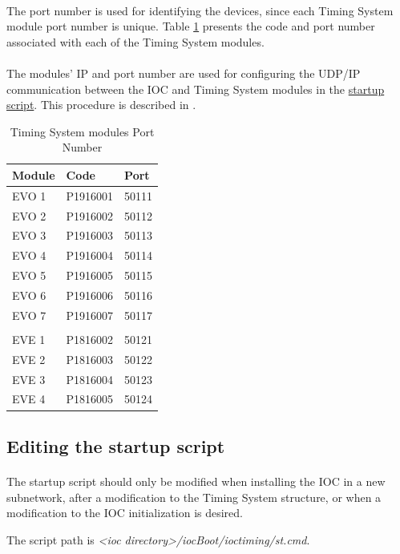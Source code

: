 \documentclass[openany]{article}
\begin{document}
		\paragraph{} The port number is used for identifying the devices, since each Timing System module port number is unique. Table \ref{tab:port-number} presents the code and port number associated with each of the Timing System modules.
		\paragraph{} The modules' IP and port number are used for configuring the UDP/IP communication between the IOC and Timing System modules in the \hyperref[sec:startup-script]{startup script}. This procedure is described in .

		\begin{table}[!h]
		\centering
		\caption{Timing System modules Port Number}
		\label{tab:port-number}	
		\begin{tabular}{l l l}
		\bfseries Module &\bfseries Code &\bfseries Port \\ \hline
		EVO 1 & P1916001 & 50111 \\ \hline
		EVO 2 & P1916002 & 50112 \\ \hline
		EVO 3 & P1916003 & 50113 \\ \hline
		EVO 4 & P1916004 & 50114 \\ \hline
		EVO 5 & P1916005 & 50115 \\ \hline
		EVO 6 & P1916006 & 50116 \\ \hline
		EVO 7 & P1916007 & 50117 \\ \hline
		& & \\ \hline
		EVE 1 & P1816002 & 50121 \\ \hline
		EVE 2 & P1816003 & 50122 \\ \hline
		EVE 3 & P1816004 & 50123 \\ \hline
		EVE 4 & P1816005 & 50124 \\ \hline
		\end{tabular}
		\end{table}
\FloatBarrier

	\subsection{Editing the startup script}\label{sec:editing-startup-script}

		\paragraph{} The startup script should only be modified when installing the IOC in a new subnetwork, after a modification to the Timing System structure, or when a modification to the IOC initialization is desired.
		\par The script path is \emph{\textless ioc directory\textgreater /iocBoot/ioctiming/st.cmd}.
\end{document}
